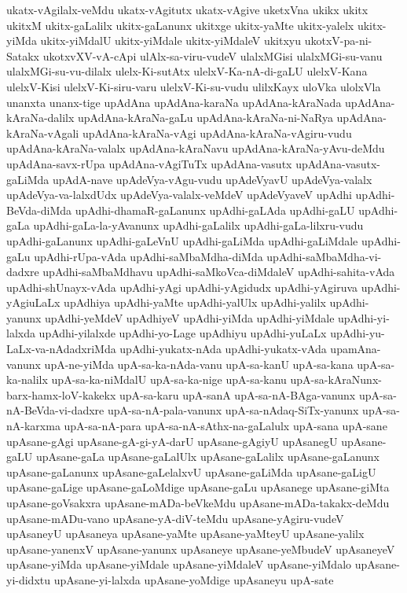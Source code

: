 {ukatx-vAgilalx-veMdu
ukatx-vAgitutx
ukatx-vAgive
uketxVna
ukikx
ukitx
ukitxM
ukitx-gaLalilx
ukitx-gaLanunx
ukitxge
ukitx-yaMte
ukitx-yalelx
ukitx-yiMda
ukitx-yiMdalU
ukitx-yiMdale
ukitx-yiMdaleV
ukitxyu
ukotxV-pa-ni-Satakx
ukotxvXV-vA-cApi
ulAlx-sa-viru-vudeV
ulalxMGisi
ulalxMGi-su-vanu
ulalxMGi-su-vu-dilalx
ulelx-Ki-sutAtx
ulelxV-Ka-nA-di-gaLU
ulelxV-Kana
ulelxV-Kisi
ulelxV-Ki-siru-varu
ulelxV-Ki-su-vudu
ulilxKayx
uloVka
ulolxVla
unanxta
unanx-tige
upAdAna
upAdAna-karaNa
upAdAna-kAraNada
upAdAna-kAraNa-dalilx
upAdAna-kAraNa-gaLu
upAdAna-kAraNa-ni-NaRya
upAdAna-kAraNa-vAgali
upAdAna-kAraNa-vAgi
upAdAna-kAraNa-vAgiru-vudu
upAdAna-kAraNa-valalx
upAdAna-kAraNavu
upAdAna-kAraNa-yAvu-deMdu
upAdAna-savx-rUpa
upAdAna-vAgiTuTx
upAdAna-vasutx
upAdAna-vasutx-gaLiMda
upAdA-nave
upAdeVya-vAgu-vudu
upAdeVyavU
upAdeVya-valalx
upAdeVya-va-lalxdUdx
upAdeVya-valalx-veMdeV
upAdeVyaveV
upAdhi
upAdhi-BeVda-diMda
upAdhi-dhamaR-gaLanunx
upAdhi-gaLAda
upAdhi-gaLU
upAdhi-gaLa
upAdhi-gaLa-la-yAvanunx
upAdhi-gaLalilx
upAdhi-gaLa-lilxru-vudu
upAdhi-gaLanunx
upAdhi-gaLeVnU
upAdhi-gaLiMda
upAdhi-gaLiMdale
upAdhi-gaLu
upAdhi-rUpa-vAda
upAdhi-saMbaMdha-diMda
upAdhi-saMbaMdha-vi-dadxre
upAdhi-saMbaMdhavu
upAdhi-saMkoVca-diMdaleV
upAdhi-sahita-vAda
upAdhi-shUnayx-vAda
upAdhi-yAgi
upAdhi-yAgidudx
upAdhi-yAgiruva
upAdhi-yAgiuLaLx
upAdhiya
upAdhi-yaMte
upAdhi-yalUlx
upAdhi-yalilx
upAdhi-yanunx
upAdhi-yeMdeV
upAdhiyeV
upAdhi-yiMda
upAdhi-yiMdale
upAdhi-yi-lalxda
upAdhi-yilalxde
upAdhi-yo-Lage
upAdhiyu
upAdhi-yuLaLx
upAdhi-yu-LaLx-va-nAdadxriMda
upAdhi-yukatx-nAda
upAdhi-yukatx-vAda
upamAna-vanunx
upA-ne-yiMda
upA-sa-ka-nAda-vanu
upA-sa-kanU
upA-sa-kana
upA-sa-ka-nalilx
upA-sa-ka-niMdalU
upA-sa-ka-nige
upA-sa-kanu
upA-sa-kAraNunx-barx-hamx-loV-kakekx
upA-sa-karu
upA-sanA
upA-sa-nA-BAga-vanunx
upA-sa-nA-BeVda-vi-dadxre
upA-sa-nA-pala-vanunx
upA-sa-nAdaq-SiTx-yanunx
upA-sa-nA-karxma
upA-sa-nA-para
upA-sa-nA-sAthx-na-gaLalulx
upA-sana
upA-sane
upAsane-gAgi
upAsane-gA-gi-yA-darU
upAsane-gAgiyU
upAsanegU
upAsane-gaLU
upAsane-gaLa
upAsane-gaLalUlx
upAsane-gaLalilx
upAsane-gaLanunx
upAsane-gaLanunx
upAsane-gaLelalxvU
upAsane-gaLiMda
upAsane-gaLigU
upAsane-gaLige
upAsane-gaLoMdige
upAsane-gaLu
upAsanege
upAsane-giMta
upAsane-goVsakxra
upAsane-mADa-beVkeMdu
upAsane-mADa-takakx-deMdu
upAsane-mADu-vano
upAsane-yA-diV-teMdu
upAsane-yAgiru-vudeV
upAsaneyU
upAsaneya
upAsane-yaMte
upAsane-yaMteyU
upAsane-yalilx
upAsane-yanenxV
upAsane-yanunx
upAsaneye
upAsane-yeMbudeV
upAsaneyeV
upAsane-yiMda
upAsane-yiMdale
upAsane-yiMdaleV
upAsane-yiMdalo
upAsane-yi-didxtu
upAsane-yi-lalxda
upAsane-yoMdige
upAsaneyu
upA-sate
}
